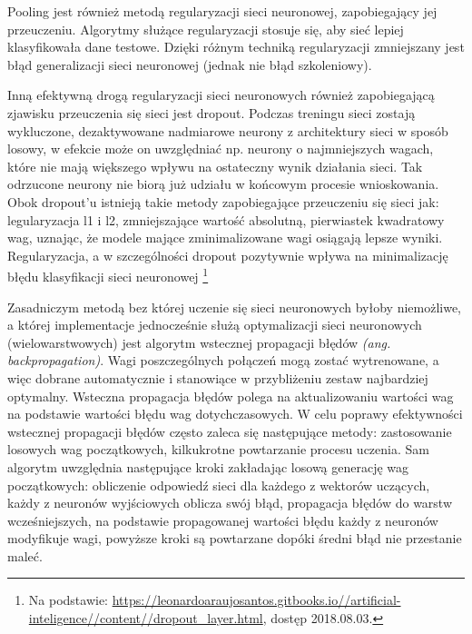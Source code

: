 \documentclass[a4paper,12pt]{article}
\begin{document}
			Pooling jest również metodą regularyzacji sieci neuronowej, zapobiegający jej przeuczeniu. Algorytmy służące regularyzacji stosuje się, aby sieć lepiej klasyfikowała dane testowe. Dzięki różnym techniką regularyzacji zmniejszany jest błąd generalizacji sieci neuronowej (jednak nie błąd szkoleniowy). 
        
        Inną efektywną drogą regularyzacji sieci neuronowych również zapobiegającą zjawisku przeuczenia się sieci jest dropout. 
			Podczas treningu sieci zostają wykluczone, dezaktywowane nadmiarowe neurony z architektury sieci w sposób losowy, 
			w efekcie może on uwzględniać np. neurony o najmniejszych wagach, które nie mają większego wpływu na ostateczny wynik działania sieci. 
			Tak odrzucone neurony nie biorą już udziału w końcowym procesie wnioskowania. Obok dropout'u istnieją takie metody zapobiegające 
			przeuczeniu się sieci jak: legularyzacja l1 i l2, zmniejszające wartość absolutną, pierwiastek kwadratowy wag, uznając, że modele mające 
			zminimalizowane wagi osiągają lepsze wyniki. Regularyzacja, a w szczególności dropout pozytywnie wpływa na minimalizację błędu 
			klasyfikacji sieci neuronowej \footnote{Na podstawie:  \href{https://leonardoaraujosantos.gitbooks.io//artificial-inteligence//content//dropout_layer.html}{\url{https://leonardoaraujosantos.gitbooks.io//artificial-inteligence//content//dropout_layer.html}}, dostęp 2018.08.03.}
        
        Zasadniczym metodą bez której uczenie się sieci neuronowych byłoby niemożliwe, a której implementacje jednocześnie służą optymalizacji sieci neuronowych (wielowarstwowych) jest algorytm wstecznej propagacji błędów 
			\textit{(ang. backpropagation)}. Wagi poszczególnych połączeń mogą zostać wytrenowane, a więc dobrane automatycznie i stanowiące 
			w przybliżeniu zestaw najbardziej optymalny. Wsteczna propagacja błędów polega na aktualizowaniu wartości wag na podstawie wartości błędu 
			wag dotychczasowych. W celu poprawy efektywności wstecznej propagacji błędów często zaleca się następujące metody: 
			zastosowanie losowych wag początkowych, kilkukrotne powtarzanie procesu uczenia. Sam algorytm uwzględnia następujące kroki 
			zakładając losową generację wag początkowych: obliczenie odpowiedź sieci dla każdego z wektorów uczących, 
			każdy z neuronów wyjściowych oblicza swój błąd, propagacja błędów do warstw wcześniejszych, na podstawie propagowanej wartości 
			błędu każdy z neuronów modyfikuje wagi, powyższe kroki są powtarzane dopóki średni błąd nie przestanie maleć.
\end{document}
